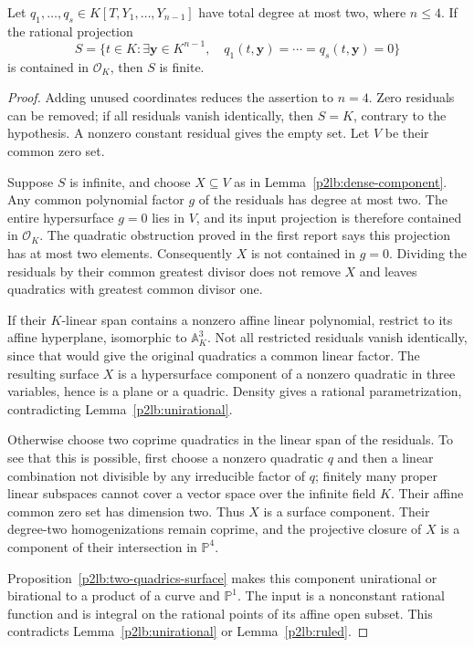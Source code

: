 \begin{theorem}\label{p2lb:quadratic-system-four}
Let $q_1,\ldots,q_s\in K[T,Y_1,\ldots,Y_{n-1}]$ have total
degree at most two, where $n\leq4$.  If the rational projection
\[
 S=\{t\in K:\exists\mathbf y\in K^{n-1},\quad
                   q_1(t,\mathbf y)=\cdots=q_s(t,\mathbf y)=0\}
\]
is contained in $\mathcal O_K$, then $S$ is finite.
\end{theorem}
\begin{proof}
Adding unused coordinates reduces the assertion to $n=4$.
Zero residuals can be removed; if all residuals vanish identically,
then $S=K$, contrary to the hypothesis.  A nonzero constant residual
gives the empty set.  Let $V$ be their common zero set.

Suppose $S$ is infinite, and choose $X\subseteq V$ as in
Lemma~\ref{p2lb:dense-component}.  Any common polynomial factor
$g$ of the residuals has degree at most two.  The entire hypersurface
$g=0$ lies in $V$, and its input projection is therefore contained
in $\mathcal O_K$.  The quadratic obstruction proved in the first
report says this projection has at most two elements.  Consequently
$X$ is not contained in $g=0$.  Dividing the residuals by their common
greatest divisor does not remove $X$ and leaves quadratics with
greatest common divisor one.

If their $K$-linear span contains a nonzero affine linear polynomial,
restrict to its affine hyperplane, isomorphic to $\mathbb A^3_K$.
Not all restricted residuals vanish identically, since that would
give the original quadratics a common linear factor.  The resulting
surface $X$ is a hypersurface component of a nonzero quadratic in
three variables, hence is a plane or a quadric.  Density gives a
rational parametrization, contradicting Lemma~\ref{p2lb:unirational}.

Otherwise choose two coprime quadratics in the linear span of the
residuals.  To see that this is possible, first choose a nonzero
quadratic $q$ and then a linear combination not divisible by any
irreducible factor of $q$; finitely many proper linear subspaces
cannot cover a vector space over the infinite field $K$.
Their affine common zero set has dimension two.  Thus $X$ is a
surface component.  Their degree-two homogenizations remain coprime,
and the projective closure of $X$ is a component of their intersection
in $\mathbb P^4$.

Proposition~\ref{p2lb:two-quadrics-surface} makes this component
unirational or birational to a product of a curve and $\mathbb P^1$.
The input is a nonconstant rational function and is integral on
the rational points of its affine open subset.  This contradicts
Lemma~\ref{p2lb:unirational} or Lemma~\ref{p2lb:ruled}.
\end{proof}

